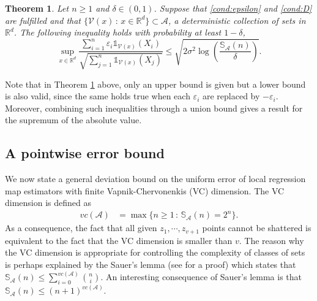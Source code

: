 \documentclass[paper=a4, fontsize=11pt]{scrartcl}
\newcommand{\ind}{\mathds{1}}
\newtheorem{theorem}{Theorem}
\begin{document}
\begin{theorem}\label{1}
Let $n\geq 1$ and $\delta \in (0,1) $. Suppose that \ref{cond:epsilon} and \ref{cond:D} are fulfilled and that $\{\mathcal V (x) \, :\, x\in \mathbb R^d\} \subset \mathcal A$, a deterministic collection of sets in $\mathbb R^d$. The following inequality holds with probability at least $1 - \delta$,
$$\sup_{x\in \mathbb R^d} \dfrac{\sum_{i=1}^n \varepsilon_i \mathds 1 _{ \mathcal V(x) }(X_i)}{\sqrt{\sum_{j=1}^n \mathds 1 _{ \mathcal V(x) }(X_j)}} \leq \sqrt{2 \sigma^2 \log\left( \frac{\mathbb S_ {  \mathcal A   } (n)}{\delta} \right)}.$$
\end{theorem}
Note that in Theorem \ref{1} above, only an upper bound is given but a lower bound is also valid, since the same holds true when each $\varepsilon _ i $ are replaced by $ -\varepsilon_i$. Moreover, combining such inequalities through a union bound gives a result for the supremum of the absolute value.



\subsection{A pointwise error bound}\label{s23}

We now state a general deviation bound on the uniform error of local regression map estimators with finite Vapnik-Chervonenkis (VC) dimension. The VC dimension is defined as 
\begin{align*}
  vc(\mathcal A)  &= \max \{ n\geq 1 \, :\, \mathbb S_\mathcal A(n) 
 = 2^n  \}. 
\end{align*}
As a consequence, the fact that all given $z_1,\cdots , z_{v+1} $ points cannot be shattered is equivalent to the fact that the VC dimension is smaller than $v$. The reason why the VC dimension is appropriate for controlling the complexity of classes of sets is perhaps explained by the Sauer's lemma (see \cite{lugosi2002pattern} for a proof) which states that
$\mathbb{S}_{\mathcal{A}}(n)  \leq  \sum_{i=0} ^{vc(\mathcal{A})} \binom{n}{i}.$ %
  An interesting consequence of Sauer's lemma is that 
$\mathbb S_\mathcal A(n) \leq (n+1)^{vc(\mathcal A) }.$
\end{document}
